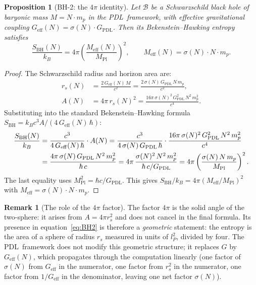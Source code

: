 \documentclass[11pt,a4paper]{article}
\newtheorem{proposition}[theorem]{Proposition}
\theoremstyle{definition}
\newtheorem{remark}[theorem]{Remark}
\newcommand{\PDL}{\textnormal{PDL}}
\newcommand{\sig}{\sigma}
\newcommand{\GPDL}{G_{\mathrm{PDL}}}
\newcommand{\Geff}{G_{\mathrm{eff}}}
\newcommand{\hb}{\hbar}
\newcommand{\SBH}{S_{\mathrm{BH}}}
\newcommand{\Meff}{M_{\mathrm{eff}}}
\newcommand{\MPl}{M_{\mathrm{Pl}}}
\newcommand{\lP}{l_P}
\begin{document}
\begin{proposition}[BH-2: the $4\pi$ identity]
\label{prop:BH2}
Let $\mathcal{B}$ be a Schwarzschild black hole of baryonic mass $M = N\cdot m_p$
in the \PDL\ framework, with effective gravitational coupling
$\Geff(N) = \sig(N)\cdot\GPDL$. Then its Bekenstein--Hawking entropy satisfies
\begin{equation}
\frac{\SBH(N)}{k_B} = 4\pi\left(\frac{\Meff(N)}{\MPl}\right)^2,
\qquad
\Meff(N) = \sig(N)\cdot N\cdot m_p.
\label{eq:BH2}
\end{equation}
\end{proposition}

\begin{proof}
The Schwarzschild radius and horizon area are:
\begin{align}
r_s(N) &= \frac{2\,\Geff(N)\,M}{c^2} = \frac{2\,\sig(N)\,\GPDL\,N\,m_p}{c^2},
\label{eq:rs} \\
A(N) &= 4\pi\,r_s(N)^2 = \frac{16\pi\,\sig(N)^2\,\GPDL^2\,N^2\,m_p^2}{c^4}.
\label{eq:A}
\end{align}
Substituting into the standard Bekenstein--Hawking formula
$\SBH = k_B c^3 A/(4\,\Geff(N)\,\hb)$:
\begin{align}
\frac{\SBH(N)}{k_B} &= \frac{c^3}{4\,\Geff(N)\,\hb}\cdot A(N)
= \frac{c^3}{4\,\sig(N)\,\GPDL\,\hb}
\cdot\frac{16\pi\,\sig(N)^2\,\GPDL^2\,N^2\,m_p^2}{c^4} \notag\\
&= \frac{4\pi\,\sig(N)\,\GPDL\,N^2\,m_p^2}{\hb\,c}
= 4\pi\,\frac{\sig(N)^2\,N^2\,m_p^2}{\hb\,c/\GPDL}
= 4\pi\left(\frac{\sig(N)\,N\,m_p}{\MPl}\right)^2.
\label{eq:proof}
\end{align}
The last equality uses $\MPl^2 = \hb c/\GPDL$. This gives
$\SBH/k_B = 4\pi(\Meff/\MPl)^2$ with $\Meff = \sig(N)\cdot N\cdot m_p$.
\end{proof}

\begin{remark}[The role of the $4\pi$ factor]
\label{rem:4pi}
The factor $4\pi$ is the solid angle of the two-sphere: it arises from
$A = 4\pi r_s^2$ and does not cancel in the final formula. Its presence in
equation~\eqref{eq:BH2} is therefore a \emph{geometric} statement: the
entropy is the area of a sphere of radius $r_s$ measured in units of $\lP^2$,
divided by four. The \PDL\ framework does not modify this geometric structure;
it replaces $G$ by $\Geff(N)$, which propagates through the computation
linearly (one factor of $\sig(N)$ from $\Geff$ in the numerator, one factor
from $r_s^2$ in the numerator, one factor from $1/\Geff$ in the denominator,
leaving one net factor $\sig(N)$).
\end{remark}
\end{document}
